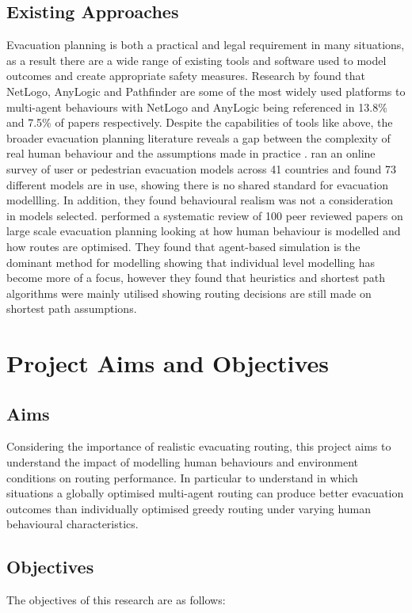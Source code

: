 \documentclass[12pt,a4paper]{report}
\begin{document}
\subsection{Existing Approaches}
Evacuation planning is both a practical and legal requirement in many situations, as a result there are a wide range of existing tools and software used to model outcomes and create appropriate safety measures. Research by \cite{SENANAYAKE_2024_PLATFORMS} found that NetLogo, AnyLogic and Pathfinder are some of the most widely used platforms to multi-agent behaviours with NetLogo and AnyLogic being referenced in 13.8\% and 7.5\% of papers respectively. Despite the capabilities of tools like above, the broader evacuation planning literature reveals a gap between the complexity of real human behaviour and the assumptions made in practice \citep{KYRIAKIDIS_2021_CONSIDER}. \cite{LOVREGLIO_2019_SURVEY} ran an online survey of user or pedestrian evacuation models across 41 countries and found 73 different models are in use, showing there is no shared standard for evacuation modellling. In addition, they found behavioural realism was not a consideration in models selected. \cite{ALDAHLAWI_2024} performed a systematic review of 100 peer reviewed papers on large scale evacuation planning looking at how human behaviour is modelled and how routes are optimised. They found that agent-based simulation is the dominant method for modelling showing that individual level modelling has become more of a focus, however they found that heuristics and shortest path algorithms were mainly utilised showing routing decisions are still made on shortest path assumptions.

\section{Project Aims and Objectives}

\subsection{Aims}
Considering the importance of realistic evacuating routing, this project aims to understand the impact of modelling human behaviours and environment conditions on routing performance. In particular to understand in which situations a globally optimised multi-agent routing can produce better evacuation outcomes than individually optimised greedy routing under varying human behavioural characteristics. 

\subsection{Objectives}
The objectives of this research are as follows:
\end{document}
